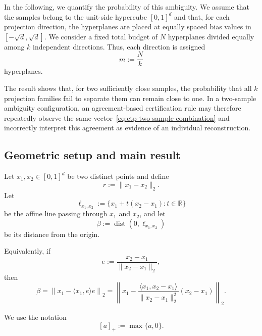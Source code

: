 In the following, we quantify the probability of this ambiguity.
We assume that the samples belong to the unit-side hypercube
$[0,1]^d$ and that, for each projection direction, the hyperplanes are
placed at equally spaced bias values in
$[-\sqrt{d},\sqrt{d}]$. We consider a fixed total budget of $N$
hyperplanes divided equally among $k$ independent directions. Thus,
each direction is assigned
\[
    m:=\frac{N}{k}
\]
hyperplanes.

The result shows that, for two sufficiently close samples, the
probability that all $k$ projection families fail to separate them can
remain close to one. In a two-sample ambiguity configuration, an
agreement-based certification rule may therefore repeatedly observe
the same vector~\eqref{eq:ctp-two-sample-combination} and incorrectly
interpret this agreement as evidence of an individual reconstruction.


\subsection{Geometric setup and main result}
\label{app:multiple-ctp-directions:result}

Let $x_1,x_2\in[0,1]^d$ be two distinct points and define
\begin{equation}
    r:=\|x_1-x_2\|_2.
    \label{eq:pair-distance}
\end{equation}
Let
\begin{equation}
    \ell_{x_1,x_2}
    :=
    \{x_1+t(x_2-x_1):t\in\mathbb{R}\}
    \label{eq:affine-line}
\end{equation}
be the affine line passing through $x_1$ and $x_2$, and let
\begin{equation}
    \beta
    :=
    \operatorname{dist}(0,\ell_{x_1,x_2})
    \label{eq:beta-definition}
\end{equation}
be its distance from the origin.

Equivalently, if
\[
    e:=\frac{x_2-x_1}{\|x_2-x_1\|_2},
\]
then
\begin{equation}
    \beta
    =
    \left\|
        x_1-\langle x_1,e\rangle e
    \right\|_2
    =
    \left\|
        x_1-
        \frac{\langle x_1,x_2-x_1\rangle}
             {\|x_2-x_1\|_2^2}(x_2-x_1)
    \right\|_2.
    \label{eq:beta-explicit}
\end{equation}

We use the notation
\[
    [a]_+:=\max\{a,0\}.
\]

